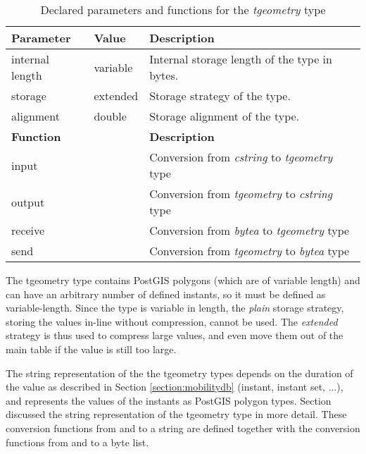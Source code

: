 \begin{table}[h!]
    \centering
    \begin{tabularx}{\textwidth}{|l|l|X|}
    \hline
    \textbf{Parameter}  & \textbf{Value}        & \textbf{Description} \\ 
    \hline
    internal length     & variable              & Internal storage length of the type in bytes. \\
    \hline
    storage             & extended              & Storage strategy of the type. \\
    \hline
    alignment           & double                & Storage alignment of the type. \\
    \hline
    \multicolumn{2}{|l|}{\textbf{Function}}     & \textbf{Description} \\ 
    \hline
    \multicolumn{2}{|l|}{input}                 & Conversion from \textit{cstring} to \textit{tgeometry} type \\
    \hline
    \multicolumn{2}{|l|}{output}                & Conversion from \textit{tgeometry} to \textit{cstring} type \\
    \hline
    \multicolumn{2}{|l|}{receive}               & Conversion from \textit{bytea} to \textit{tgeometry} type \\
    \hline
    \multicolumn{2}{|l|}{send}                  & Conversion from \textit{tgeometry} to \textit{bytea} type \\
    \hline
    \end{tabularx}
    \caption{Declared parameters and functions for the \textit{tgeometry} type}
    \label{table:tgeometry_type_declaration}
\end{table}

The tgeometry type contains PostGIS polygons (which are of variable length) and can have an arbitrary number of defined instants, so it must be defined as variable-length. Since the type is variable in length, the \textit{plain} storage strategy, storing the values in-line without compression, cannot be used. The \textit{extended} strategy is thus used to compress large values, and even move them out of the main table if the value is still too large.

The string representation of the the tgeometry types depends on the duration of the value as described in Section \ref{section:mobilitydb} (instant, instant set, ...), and represents the values of the instants as PostGIS polygon types. Section  discussed the string representation of the tgeometry type in more detail. These conversion functions from and to a string are defined together with the conversion functions from and to a byte list.

